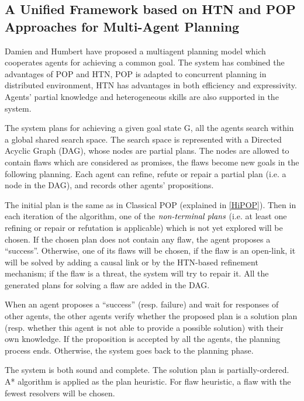 \subsection{A Unified Framework based on HTN and POP Approaches for Multi-Agent Planning\cite{multi2}}
Damien and Humbert have proposed a multiagent planning model which cooperates agents for achieving a common goal. The system has combined the advantages of POP and HTN, POP is adapted to concurrent planning in distributed environment, HTN has advantages in both efficiency and expressivity. Agents’ partial knowledge and heterogeneous skills are also supported in the system.

The system plans for achieving a given goal state G, all the agents search within a global shared search space. The search space is represented with a Directed Acyclic Graph (DAG), whose nodes are partial plans. The nodes are allowed to contain flaws which are considered as promises, the flaws become new goals in the following planning. Each agent can refine, refute or repair a partial plan (i.e. a node in the DAG), and records other agents’ propositions. 

The initial plan is the same as in Classical POP (explained in \autoref{HiPOP}). Then in each iteration of the algorithm, one of the $\emph{non-terminal plans}$ (i.e. at least one refining or repair or refutation is applicable) which is not yet explored will be chosen. If the chosen plan does not contain any flaw, the agent proposes a “success”. Otherwise, one of its flaws will be chosen, if the flaw is an open-link, it will be solved by adding a causal link or by the HTN-based refinement mechanism; if the flaw is a threat, the system will try to repair it. All the generated plans for solving a flaw are added in the DAG.

When an agent proposes a “success” (resp. failure) and wait for responses of other agents, the other agents verify whether the proposed plan is a solution plan (resp. whether this agent is not able to provide a possible solution) with their own knowledge. If the proposition is accepted by all the agents, the planning process ends. Otherwise, the system goes back to the planning phase.

The system is both sound and complete. The solution plan is partially-ordered. A* algorithm is applied as the plan heuristic. For flaw heuristic, a flaw with the fewest resolvers will be chosen. 
